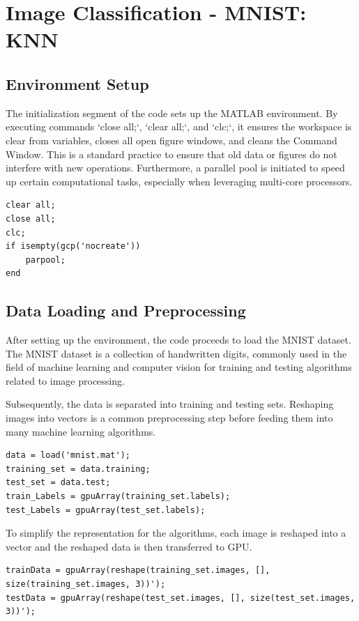 \section{Image Classification - MNIST: KNN}
\label{sec:Image Classification - MNIST:KNN}

\subsection{Environment Setup}
The initialization segment of the code sets up the MATLAB environment. By executing commands `close all;`, `clear all;`, and `clc;`, it ensures the workspace is clear from variables, closes all open figure windows, and cleans the Command Window. This is a standard practice to ensure that old data or figures do not interfere with new operations. Furthermore, a parallel pool is initiated to speed up certain computational tasks, especially when leveraging multi-core processors.
\begin{lstlisting}[style=Matlab-editor]
clear all;
close all;
clc;
if isempty(gcp('nocreate'))
    parpool;
end
\end{lstlisting}
\subsection{Data Loading and Preprocessing}
After setting up the environment, the code proceeds to load the MNIST dataset. The MNIST dataset is a collection of handwritten digits, commonly used in the field of machine learning and computer vision for training and testing algorithms related to image processing.

Subsequently, the data is separated into training and testing sets. Reshaping images into vectors is a common preprocessing step before feeding them into many machine learning algorithms.
\begin{lstlisting}[style=Matlab-editor]
data = load('mnist.mat');
training_set = data.training;
test_set = data.test;
train_Labels = gpuArray(training_set.labels);
test_Labels = gpuArray(test_set.labels);
\end{lstlisting}
To simplify the representation for the algorithms, each image is reshaped into a vector and the reshaped data is then transferred to GPU.

\begin{lstlisting}[style=Matlab-editor]
trainData = gpuArray(reshape(training_set.images, [], size(training_set.images, 3))');
testData = gpuArray(reshape(test_set.images, [], size(test_set.images, 3))');
\end{lstlisting}


